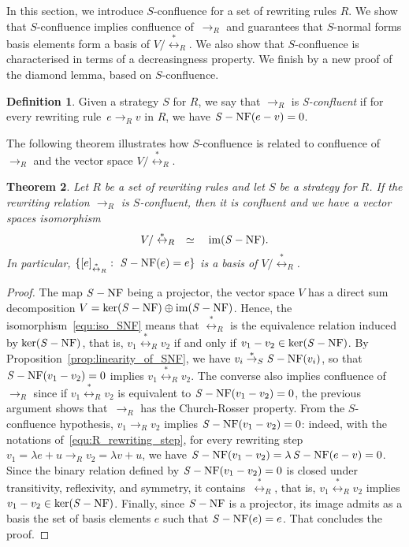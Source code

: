 \documentclass[10pt]{easychair}
\newtheorem{theorem}{Theorem}[section]
\theoremstyle{definition}
\newtheorem{definition}[theorem]{Definition}
\DeclareMathOperator{\im}{im}
\newcommand\rewR{\to_R}
\newcommand\transS{\overset{*}{\to}_S}
\newcommand\equivR{\overset{*}{\leftrightarrow}_R}
\DeclareMathOperator{\SNF}{{\it S}-NF}
\begin{document}
In this section, we introduce $S$-confluence for a set of rewriting rules
$R$. We show that $S$-confluence implies confluence of~$\rewR$ and
guarantees that $S$-normal forms basis elements form a basis of 
$V/\equivR$. We also show that $S$-confluence is characterised in terms
of a decreasingness property. We finish by a new proof of the diamond
lemma, based on $S$-confluence. 
\smallskip

\begin{definition}\label{def:standardisation_property}
  Given a strategy $S$ for $R$, we say that $\rewR$ is \emph{S-confluent}
  if for every rewriting rule~$e\rewR v$ in $R$, we have $\SNF(e-v)=0$.
\end{definition}
\smallskip

The following theorem illustrates how $S$-confluence is related to
confluence of $\rewR$ and the vector space $V/\equivR$.
\medskip

\begin{theorem}\label{thm:S-confluence_criterion}
  Let $R$ be a set of rewriting rules and let $S$ be a strategy for $R$.
  If the rewriting relation $\rewR$ is $S$-confluent, then it is
  confluent and we have a vector spaces isomorphism
  \begin{equation}\label{equ:iso_SNF}
    V/\equivR\quad\simeq\quad\im(\SNF).
  \end{equation}
  In particular, $\{[e]_{\equivR}:\ \SNF(e)=e\}$ is a basis of
  $V/\equivR$.
\end{theorem}

\begin{proof}
  The map $\SNF$ being a projector, the vector space $V$ has a direct sum
  decomposition $V=\ker(\SNF)\oplus\im(\SNF)$. Hence, the
  isomorphism~\eqref{equ:iso_SNF} means that $\equivR$ is the equivalence
  relation induced by $\ker(\SNF)$, that is, $v_1\equivR v_2$ if and only
  if $v_1-v_2\in\ker(\SNF)$. By Proposition~\ref{prop:linearity_of_SNF},
  we have $v_i\transS\SNF(v_i)$, so that~$\SNF(v_1-v_2)=0$ implies
  $v_1\equivR v_2$. The converse also implies confluence of $\rewR$ since
  if $v_1\equivR v_2$ is equivalent to $\SNF(v_1-v_2)=0$, the previous
  argument shows that~$\rewR$ has the Church-Rosser property. From the
  $S$-confluence hypothesis, $v_1\rewR v_2$ implies $\SNF(v_1-v_2)=0$:
  indeed, with the notations of~\eqref{equ:R_rewriting_step}, for every
  rewriting step $v_1=\lambda e+u\rewR v_2=\lambda v+u$, we have
  $\SNF(v_1-v_2)=\lambda\SNF(e-v)=0$. Since the binary relation defined
  by $\SNF(v_1-v_2)=0$ is closed under transitivity, reflexivity, and
  symmetry, it contains~$\equivR$, that is, $v_1\equivR v_2$ implies
  $v_1-v_2\in\ker(\SNF)$. Finally, since $\SNF$ is a projector, its image
  admits as a basis the set of basis elements $e$ such that $\SNF(e)=e$.
  That concludes the proof.
\end{proof}
\smallskip
\end{document}
